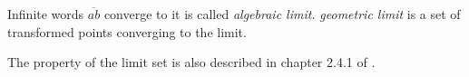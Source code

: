 Infinite words $\overline{ab}$ converge to it is called \textit{algebraic limit.}
\textit{geometric limit} is a set of transformed points converging to
the limit.

The property of the limit set is also described in chapter 2.4.1 of
\cite{marden_2016}.



